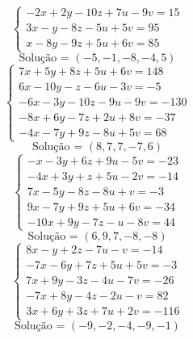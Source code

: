 \documentclass[12pt,oneside,a4paper,fleqn]{article}
\begin{document}
\begin{multicols*}{2}
\begin{equation*}
\begin{cases}
-2x+2y-10z+7u-9v=15 \\
3x-y-8z-5u+5v=95 \\
x-8y-9z+5u+6v=85
\end{cases}
\end{equation*}
\begin{equation*}
\text{Solução = }\left(-5,-1,-8,-4,5\right)
\end{equation*}
\vspace{\baselineskip}
\begin{equation*}
\begin{cases}
7x+5y+8z+5u+6v=148 \\
6x-10y-z-6u-3v=-5 \\
-6x-3y-10z-9u-9v=-130 \\
-8x+6y-7z+2u+8v=-37 \\
-4x-7y+9z-8u+5v=68
\end{cases}
\end{equation*}
\begin{equation*}
\text{Solução = }\left(8,7,7,-7,6\right)
\end{equation*}
\vspace{\baselineskip}
\begin{equation*}
\begin{cases}
-x-3y+6z+9u-5v=-23 \\
-4x+3y+z+5u-2v=-14 \\
7x-5y-8z-8u+v=-3 \\
9x-7y+9z+5u+6v=-34 \\
-10x+9y-7z-u-8v=44
\end{cases}
\end{equation*}
\begin{equation*}
\text{Solução = }\left(6,9,7,-8,-8\right)
\end{equation*}
\vspace{\baselineskip}
\begin{equation*}
\begin{cases}
8x-y+2z-7u-v=-14 \\
-7x-6y+7z+5u+5v=-3 \\
7x+9y-3z-4u-7v=-26 \\
-7x+8y-4z-2u-v=82 \\
3x+6y+3z+7u+2v=-116
\end{cases}
\end{equation*}
\begin{equation*}
\text{Solução = }\left(-9,-2,-4,-9,-1\right)
\end{equation*}
\vspace{\baselineskip}
\begin{equation*}

\end{equation*}
\end{multicols*}
\end{document}
